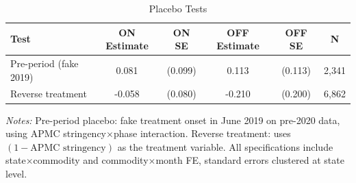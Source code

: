 \begin{table}[htbp]
\centering
\caption{Placebo Tests}
\label{tab:placebo}
\begin{tabular}{lccccc}
\toprule
Test & ON Estimate & ON SE & OFF Estimate & OFF SE & N \\
\midrule
Pre-period (fake 2019) & 0.081 & (0.099) & 0.113 & (0.113) & 2,341 \\
Reverse treatment & -0.058 & (0.080) & -0.210 & (0.200) & 6,862 \\
\bottomrule
\end{tabular}
\par\vspace{0.3em}
{\small\textit{Notes:} Pre-period placebo: fake treatment onset in June 2019 on pre-2020 data,
using APMC stringency$\times$phase interaction.
Reverse treatment: uses $(1 - \text{APMC stringency})$ as the treatment variable.
All specifications include state$\times$commodity and commodity$\times$month FE,
standard errors clustered at state level.}
\end{table}
